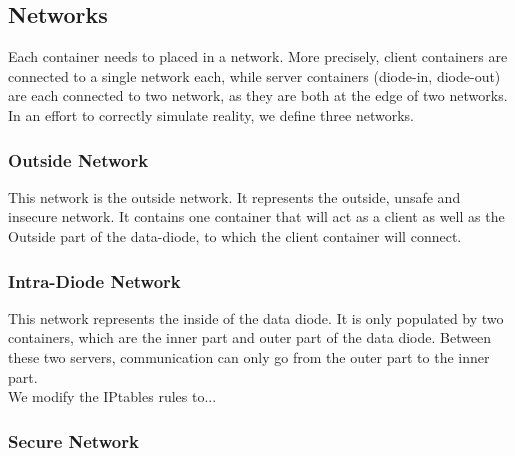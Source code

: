 \documentclass[a4paper,11pt]{article}
\begin{document}
\subsection{Networks}
Each container needs to placed in a network. More precisely, client containers are connected to a single network each, while server containers (diode-in, diode-out) are each connected to two network, as they are both at the edge of two networks.\\

In an effort to correctly simulate reality, we define three networks.

\subsubsection{Outside Network}
This network is the outside network. It represents the outside, unsafe and insecure network. It contains one container that will act as a client as well as the Outside part of the data-diode, to which the client container will connect.

\subsubsection{Intra-Diode Network}
This network represents the inside of the data diode. It is only populated by two containers, which are the inner part and outer part of the data diode. Between these two servers, communication can only go from the outer part to the inner part.\\

We modify the IPtables rules to...

\subsubsection{Secure Network}
\end{document}
